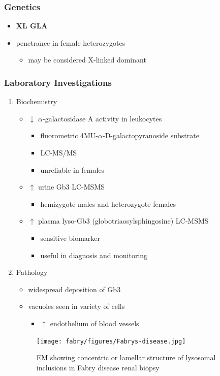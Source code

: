 \documentclass[12pt]{scrartcl}
\begin{document}
\subsubsection{Genetics}
\label{sec:org4b114cd}
\begin{itemize}
\item \textbf{XL GLA}
\item penetrance in female heterozygotes
\begin{itemize}
\item may be considered X-linked dominant
\end{itemize}
\end{itemize}

\subsubsection{Laboratory Investigations}
\label{sec:orga834e49}
\begin{enumerate}
\item Biochemistry
\label{sec:org36af51d}
\begin{itemize}
\item \(\downarrow\) \(\alpha\)-galactosidase A activity in leukocytes
\begin{itemize}
\item fluorometric 4MU-\(\alpha\)-D-galactopyranoside substrate
\item LC-MS/MS
\item unreliable in females
\end{itemize}
\item \(\uparrow\) urine Gb3 LC-MSMS 
\begin{itemize}
\item hemizygote males and heterozygote females
\end{itemize}
\item \(\uparrow\) plasma lyso-Gb3 (globotriaosylsphingosine) LC-MSMS
\begin{itemize}
\item sensitive biomarker
\item useful in diagnosis and monitoring
\end{itemize}
\end{itemize}

\item Pathology
\label{sec:org585e0e8}
\begin{itemize}
\item widespread deposition of Gb3
\item vacuoles seen in variety of cells
\begin{itemize}
\item \(\uparrow\) endothelium of blood vessels
\end{itemize}
\end{itemize}

\begin{figure}[htbp]
\centering
\texttt{[image: fabry/figures/Fabrys-disease.jpg]}
\caption[Fabry EM]{\label{fig:orgdc8ec68}EM showing concentric or lamellar structure of lysosomal inclusions in Fabry disease renal biopsy}
\end{figure}
\end{enumerate}
\end{document}
